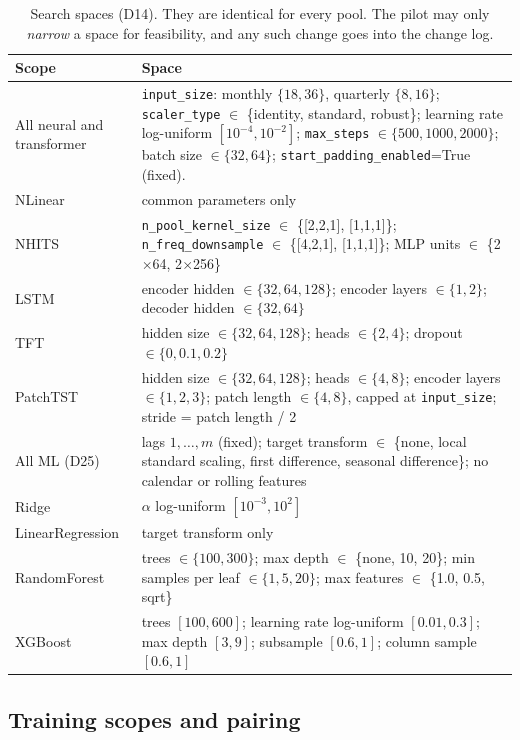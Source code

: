 \documentclass[11pt,a4paper]{article}
\newcommand{\code}[1]{\texttt{#1}}
\begin{document}
\begin{table}[h]
\centering\small
\caption{Search spaces (D14). They are identical for every pool. The pilot may only \emph{narrow}
a space for feasibility, and any such change goes into the change log.}\label{tab:spaces}
\begin{tabularx}{\linewidth}{@{}l X@{}}
\toprule
Scope & Space \\
\midrule
All neural and transformer & \code{input_size}: monthly $\{18, 36\}$, quarterly $\{8, 16\}$; \code{scaler_type} $\in$ \{identity, standard, robust\}; learning rate log-uniform $[10^{-4}, 10^{-2}]$; \code{max_steps} $\in \{500, 1000, 2000\}$; batch size $\in \{32, 64\}$; \code{start_padding_enabled}=True (fixed). \\
NLinear & common parameters only \\
NHITS & \code{n_pool_kernel_size} $\in$ \{[2,2,1], [1,1,1]\}; \code{n_freq_downsample} $\in$ \{[4,2,1], [1,1,1]\}; MLP units $\in$ \{2$\times$64, 2$\times$256\} \\
LSTM & encoder hidden $\in \{32, 64, 128\}$; encoder layers $\in \{1, 2\}$; decoder hidden $\in \{32, 64\}$ \\
TFT & hidden size $\in \{32, 64, 128\}$; heads $\in \{2, 4\}$; dropout $\in \{0, 0.1, 0.2\}$ \\
PatchTST & hidden size $\in \{32, 64, 128\}$; heads $\in \{4, 8\}$; encoder layers $\in \{1, 2, 3\}$; patch length $\in \{4, 8\}$, capped at \code{input_size}; stride = patch length / 2 \\
All ML (D25) & lags $1,\dots,m$ (fixed); target transform $\in$ \{none, local standard scaling, first difference, seasonal difference\}; no calendar or rolling features \\
Ridge & $\alpha$ log-uniform $[10^{-3}, 10^{2}]$ \\
LinearRegression & target transform only \\
RandomForest & trees $\in \{100, 300\}$; max depth $\in$ \{none, 10, 20\}; min samples per leaf $\in \{1, 5, 20\}$; max features $\in$ \{1.0, 0.5, sqrt\} \\
XGBoost & trees $[100, 600]$; learning rate log-uniform $[0.01, 0.3]$; max depth $[3, 9]$; subsample $[0.6, 1]$; column sample $[0.6, 1]$ \\
\bottomrule
\end{tabularx}
\end{table}

\subsection{Training scopes and pairing}
\end{document}
